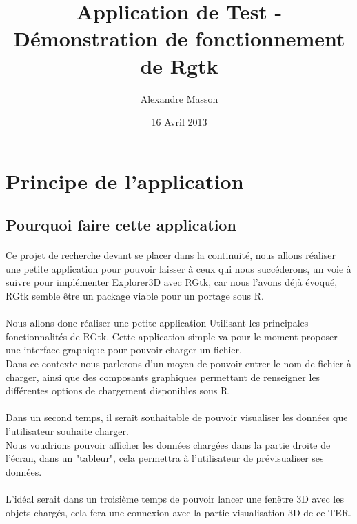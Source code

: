 \documentclass{article}
\title{Application de Test - Démonstration de fonctionnement de Rgtk}
\author{Alexandre Masson}
\date{16 Avril 2013}
\begin{document}
\maketitle
\newpage
\tableofcontents
\newpage

\section{Principe de l'application}
\subsection{Pourquoi faire cette application}
\paragraph{}
Ce projet de recherche devant se placer dans la continuité, nous allons réaliser une petite application pour pouvoir laisser à ceux qui nous succéderons, un voie à suivre pour implémenter Explorer3D avec RGtk, car nous l'avons déjà évoqué, RGtk semble être un package viable pour un portage sous R. 

\paragraph{} 
Nous allons donc réaliser une petite application Utilisant les principales fonctionnalités de RGtk. Cette application simple va pour le moment proposer une interface graphique pour pouvoir charger un fichier.\\
Dans ce contexte nous parlerons d'un moyen de pouvoir entrer le nom de fichier à charger, ainsi que des composants graphiques permettant de renseigner les différentes options de chargement disponibles sous R.

\paragraph{} 
Dans un second temps, il serait souhaitable de pouvoir visualiser les données que l'utilisateur souhaite charger.\\
Nous voudrions pouvoir afficher les données chargées dans la partie droite de l'écran, dans un "tableur", cela permettra à l'utilisateur de prévisualiser ses données. 

\paragraph{}
L'idéal serait dans un troisième temps de pouvoir lancer une fenêtre 3D avec les objets chargés, cela fera une connexion avec la partie visualisation 3D de ce TER.
\end{document}
